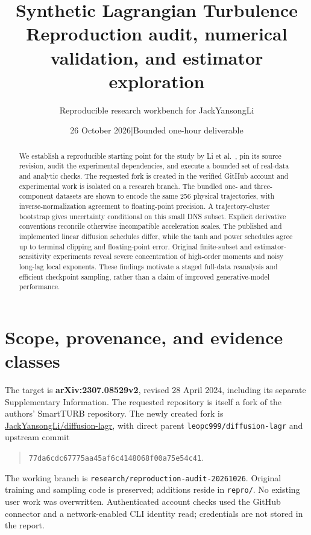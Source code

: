\documentclass[10pt,a4paper]{article}
\title{\color{ink}Synthetic Lagrangian Turbulence\\[4pt]\large Reproduction audit, numerical validation, and estimator exploration}
\author{Reproducible research workbench for JackYansongLi}
\date{26 October 2026\quad |\quad Bounded one-hour deliverable}
\begin{document}
\maketitle
\begin{center}
\end{center}

\begin{abstract}
We establish a reproducible starting point for the study by Li et al.\ \cite{li2024}, pin its source revision, audit the experimental dependencies, and execute a bounded set of real-data and analytic checks. The requested fork is created in the verified GitHub account and experimental work is isolated on a research branch. The bundled one- and three-component datasets are shown to encode the same 256 physical trajectories, with inverse-normalization agreement to floating-point precision. A trajectory-cluster bootstrap gives uncertainty conditional on this small DNS subset. Explicit derivative conventions reconcile otherwise incompatible acceleration scales. The published and implemented linear diffusion schedules differ, while the tanh and power schedules agree up to terminal clipping and floating-point error. Original finite-subset and estimator-sensitivity experiments reveal severe concentration of high-order moments and noisy long-lag local exponents. These findings motivate a staged full-data reanalysis and efficient checkpoint sampling, rather than a claim of improved generative-model performance.
\end{abstract}

\section{Scope, provenance, and evidence classes}
The target is \textbf{arXiv:2307.08529v2}, revised 28 April 2024, including its separate Supplementary Information. The requested repository is itself a fork of the authors' SmartTURB repository. The newly created fork is
\href{https://github.com/JackYansongLi/diffusion-lagr}{JackYansongLi/diffusion-lagr}, with direct parent \texttt{leopc999/diffusion-lagr} and upstream commit
\begin{quote}\small\texttt{77da6cdc67775aa45af6c4148068f00a75e54c41}.\end{quote}
The working branch is \texttt{research/reproduction-audit-20261026}. Original training and sampling code is preserved; additions reside in \texttt{repro/}. No existing user work was overwritten. Authenticated account checks used the GitHub connector and a network-enabled CLI identity read; credentials are not stored in the report.
\end{document}
